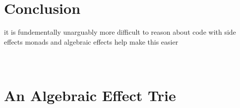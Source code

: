 \documentclass[a4paper,10pt]{article}
\theoremstyle{definition}
\begin{document}
\pagebreak
\tableofcontents

\pagebreak


\pagebreak


\pagebreak


\pagebreak


\pagebreak


\pagebreak
\section{Conclusion}
it is fundementally unarguably more difficult to reason about code with side effects
monads and algebraic effects help make this easier

\pagebreak
\appendix



\section{\\An Algebraic Effect Trie}

\pagebreak


\end{document}

